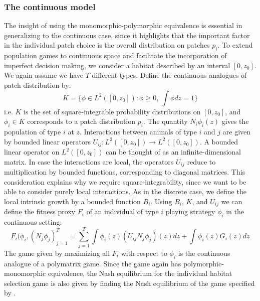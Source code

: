 \subsubsection{The continuous model}
The insight of using the monomorphic-polymorphic equivalence is essential in generalizing to the continuous case, since it highlights that the important factor in the individual patch choice  is the overall distribution on patches $p_i$. To extend population games to continuous space and facilitate the incorporation of imperfect decision making, we consider a habitat described by an interval $[0,z_0]$. We again assume we have $T$ different types. Define the continuous analogues of patch distribution by:
\begin{equation}
  K = \{ \phi \in L^2([0,z_0]) : \phi \geq 0,~\int \phi dz = 1\}
  \label{eq:space_of_dists}
\end{equation}
i.e. $K$ is the set of square-integrable probability distributions on $[0,z_0]$, and $\phi_i \in K$ corresponds to a patch distribution $p_i$. The quantity $N_i \phi_i(z)$ gives the population of type $i$ at $z$. Interactions between animals of type $i$ and $j$ are given by bounded linear operators $U_{ij}: L^2([0,z_0]) \to L^2([0,z_0])$. A bounded linear operator on $L^2([0,z_0])$ can be thought of as an infinite-dimensional matrix. In case the interactions are local, the operators $U_{ij}$ reduce to multiplication by bounded functions, corresponding to diagonal matrices. This consideration explains why we require square-integrability, since we want to be able to consider purely local interactions. As in the discrete case, we define the local intrinsic growth by a bounded function $B_i$. Using $B_i$, $K$, and $U_{ij}$ we can define the fitness proxy $F_i$ of an individual of type $i$ playing strategy $\phi_i$ in the continuous setting:
\begin{equation}
  F_i(\phi_i, (N_j \phi_j)_{j=1}^T = \sum_{j=1}^T \int \phi_i(z) (U_{ij}N_j \phi_j)(z) dz + \int \phi_i(z) G_i(z) dz %
  \label{eq:utility}
\end{equation}
The game given by maximizing all $F_i$ with respect to $\phi_i$ is the continuous analogue of a polymatrix game. Since the game again has polymorphic-monomorphic equivalence, the Nash equilibrium for the individual habitat selection game is also given by finding the Nash equilibrium of the game specified by .

